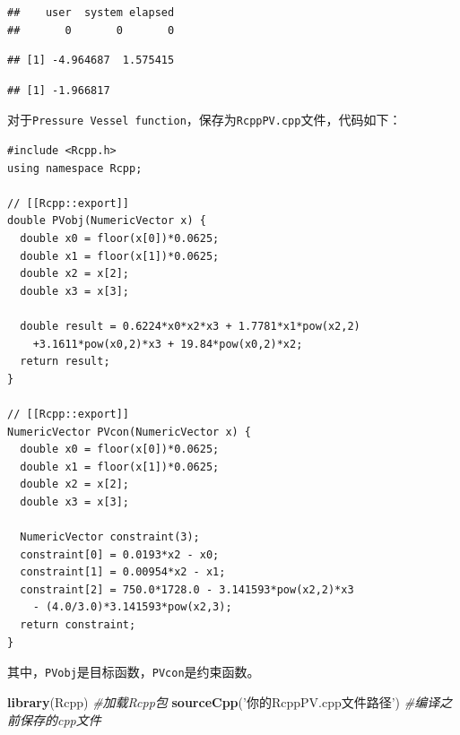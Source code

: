 \documentclass[]{ctexbook}
\newenvironment{Shaded}{\begin{snugshade}}{\end{snugshade}}
\newcommand{\KeywordTok}[1]{\textcolor[rgb]{0.13,0.29,0.53}{\textbf{#1}}}
\newcommand{\StringTok}[1]{\textcolor[rgb]{0.31,0.60,0.02}{#1}}
\newcommand{\CommentTok}[1]{\textcolor[rgb]{0.56,0.35,0.01}{\textit{#1}}}
\newcommand{\OperatorTok}[1]{\textcolor[rgb]{0.81,0.36,0.00}{\textbf{#1}}}
\newcommand{\NormalTok}[1]{#1}
\begin{document}
\begin{verbatim}
##    user  system elapsed 
##       0       0       0
\end{verbatim}

\begin{Shaded}
\end{Shaded}

\begin{verbatim}
## [1] -4.964687  1.575415
\end{verbatim}

\begin{Shaded}
\end{Shaded}

\begin{verbatim}
## [1] -1.966817
\end{verbatim}

对于\texttt{Pressure\ Vessel\ function}，保存为\texttt{RcppPV.cpp}文件，代码如下：

\begin{verbatim}
#include <Rcpp.h>
using namespace Rcpp;

// [[Rcpp::export]]
double PVobj(NumericVector x) {
  double x0 = floor(x[0])*0.0625;
  double x1 = floor(x[1])*0.0625;
  double x2 = x[2];
  double x3 = x[3];
  
  double result = 0.6224*x0*x2*x3 + 1.7781*x1*pow(x2,2) 
    +3.1611*pow(x0,2)*x3 + 19.84*pow(x0,2)*x2;
  return result;
}

// [[Rcpp::export]]
NumericVector PVcon(NumericVector x) {
  double x0 = floor(x[0])*0.0625;
  double x1 = floor(x[1])*0.0625;
  double x2 = x[2];
  double x3 = x[3];
  
  NumericVector constraint(3);
  constraint[0] = 0.0193*x2 - x0;
  constraint[1] = 0.00954*x2 - x1;
  constraint[2] = 750.0*1728.0 - 3.141593*pow(x2,2)*x3 
    - (4.0/3.0)*3.141593*pow(x2,3);
  return constraint;
}
\end{verbatim}

其中，\texttt{PVobj}是目标函数，\texttt{PVcon}是约束函数。

\begin{Shaded}
\begin{Highlighting}[]
\KeywordTok{library}\NormalTok{(Rcpp) }\CommentTok{#加载Rcpp包}
\KeywordTok{sourceCpp}\NormalTok{(}\StringTok{'你的RcppPV.cpp文件路径'}\NormalTok{) }\CommentTok{#编译之前保存的cpp文件}
\end{Highlighting}
\end{Shaded}
\end{document}
